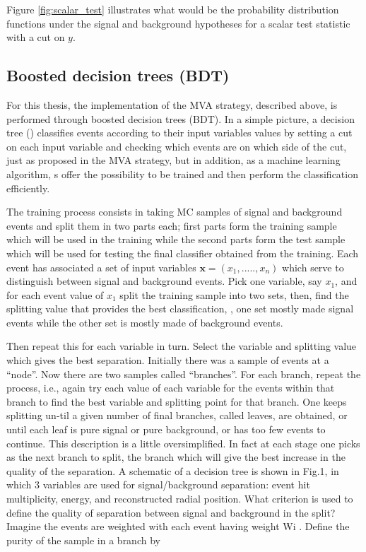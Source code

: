 Figure \ref{fig:scalar_test} illustrates what would be the probability distribution functions under the signal and background hypotheses for a scalar test statistic with a cut on $y$.


\subsection{Boosted decision trees (BDT) }

For this thesis, the implementation of the MVA strategy, described above, is performed through boosted decision trees (BDT). In a simple picture, a decision tree (\dt) classifies events according to their input variables values by setting a cut on each input variable and checking which events are on which side of the cut, just as proposed in the MVA strategy, but in addition, as a machine learning algorithm, \dt s offer the possibility to be trained and then perform the classification efficiently.   

The training process consists in taking MC samples of signal and background events and split them in two parts each; first parts form the training sample which will be used in the \dt training while the second parts form the test sample which will be used for testing the final classifier obtained from the training. Each event has associated a set of input variables $\textbf{x}=(x_1,.....,x_n)$ which serve to distinguish between signal and background events. Pick one variable, say $x_1$, and for each event value of $x_1$ split the training sample into two sets, then, find the splitting value that provides the best classification, \ie, one set mostly made signal events while the other set is mostly made of background events.


Then repeat this
for each variable in turn. Select the variable and splitting
value which gives the best separation. Initially there
was a sample of events at a “node”. Now there are two
samples called “branches”. For each branch, repeat the
process, i.e., again try each value of each variable for the
events within that branch to find the best variable and
splitting point for that branch. One keeps splitting un-til a given number of final branches, called leaves, are
obtained, or until each leaf is pure signal or pure background,
or has too few events to continue. This description
is a little oversimplified. In fact at each stage one
picks as the next branch to split, the branch which will
give the best increase in the quality of the separation. A
schematic of a decision tree is shown in Fig.1, in which
3 variables are used for signal/background separation:
event hit multiplicity, energy, and reconstructed radial
position.
What criterion is used to define the quality of separation
between signal and background in the split? Imagine
the events are weighted with each event having weight
Wi
. Define the purity of the sample in a branch by


